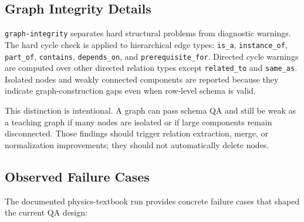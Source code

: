 \documentclass[11pt,letterpaper]{article}
\newcommand{\code}[1]{\nolinkurl{#1}}
\begin{document}
\subsection{Graph Integrity Details}

\code{graph-integrity} separates hard structural problems from diagnostic warnings. The hard cycle check is applied to hierarchical edge types: \code{is_a}, \code{instance_of}, \code{part_of}, \code{contains}, \code{depends_on}, and \code{prerequisite_for}. Directed cycle warnings are computed over other directed relation types except \code{related_to} and \code{same_as}. Isolated nodes and weakly connected components are reported because they indicate graph-construction gaps even when row-level schema is valid.

This distinction is intentional. A graph can pass schema QA and still be weak as a teaching graph if many nodes are isolated or if large components remain disconnected. Those findings should trigger relation extraction, merge, or normalization improvements; they should not automatically delete nodes.

\subsection{Observed Failure Cases}

The documented physics-textbook run provides concrete failure cases that shaped the current QA design:
\end{document}
